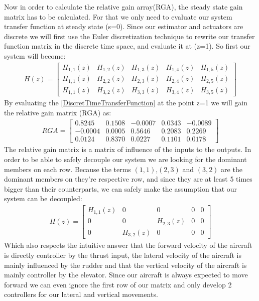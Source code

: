 \documentclass[twocolumn,showpacs,
    nofootinbib,aps,superscriptaddress,
    eqsecnum,prd,showkeys,10pt,floatfix]{revtex4}
\begin{document}
Now in order to calculate the relative gain array(RGA), the steady state gain matrix has to be calculated.
For that we only need to evaluate our system transfer function at steady state (s=0).
Since our estimator and actuators are discrete we will first use the Euler discretization technique to rewrite our transfer function matrix in the discrete time space, and evaluate it at (z=1).
So first our system will become:
\begin{align}
    H(z)=\begin{bmatrix}
             H_{1,1}(z) & H_{1,2}(z) & H_{1,3}(z) & H_{1,4}(z) & H_{1,5}(z) \\
             H_{1,1}(z) & H_{2,2}(z) & H_{2,3}(z) & H_{2,4}(z) & H_{2,5}(z) \\
             H_{1,1}(z) & H_{3,2}(z) & H_{3,3}(z) & H_{3,4}(z) & H_{3,5}(z)
         \end{bmatrix}
    \label{DiscretTimeTransferFunction}
\end{align}
By evaluating the {\ref{DiscretTimeTransferFunction}} at the point z=1 we will gain the relative gain matrix (RGA) as:
\begin{align}
    RGA=\begin{bmatrix}
            0.8245  & 0.1508 & -0.0007 & 0.0343 & -0.0089 \\
            -0.0004 & 0.0005 & 0.5646  & 0.2083 & 0.2269  \\
            0.0124  & 0.8370 & 0.0227  & 0.1101 & 0.0178
        \end{bmatrix}
\end{align}
The relative gain matrix is a matrix of influence of the inputs to the outputs.
In order to be able to safely decouple our system we are looking for the dominant members on each row.
Because the terms $(1,1)$,$(2,3)$ and $(3,2)$ are the dominant members on they're respective row, and since they are at least 5 times bigger than their counterparts, we can safely make the assumption that our system can be decoupled:
\begin{align}
    H(z)=\begin{bmatrix}
             H_{1,1}(z) & 0          & 0          & 0 & 0 \\
             0          & 0          & H_{2,3}(z) & 0 & 0 \\
             0          & H_{3,2}(z) & 0          & 0 & 0
         \end{bmatrix}
    \label{DecoupledDiscretTimeTransferFunction}
\end{align}
Which also respects the intuitive answer that the forward velocity of the aircraft is directly controller by the thrust input, the lateral velocity of the aircraft is mainly influenced by the rudder and that the vertical velocity of the aircraft is mainly controller by the elevator.
Since our aircraft is always expected to move forward we can even ignore the first row of our matrix and only develop 2 controllers for our lateral and vertical movements.
\end{document}
